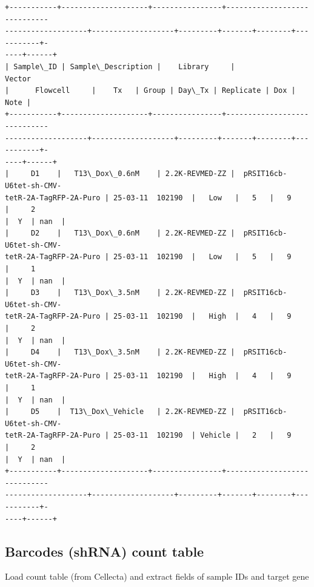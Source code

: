 \documentclass[11pt]{article}
\begin{document}
    \begin{Verbatim}[commandchars=\\\{\}]
+-----------+--------------------+----------------+-----------------------------
-------------------+-------------------+---------+-------+--------+-----------+-
----+------+
| Sample\_ID | Sample\_Description |    Library     |                     Vector
|      Flowcell     |    Tx   | Group | Day\_Tx | Replicate | Dox | Note |
+-----------+--------------------+----------------+-----------------------------
-------------------+-------------------+---------+-------+--------+-----------+-
----+------+
|     D1    |   T13\_Dox\_0.6nM    | 2.2K-REVMED-ZZ |  pRSIT16cb-U6tet-sh-CMV-
tetR-2A-TagRFP-2A-Puro | 25-03-11  102190  |   Low   |   5   |   9    |     2
|  Y  | nan  |
|     D2    |   T13\_Dox\_0.6nM    | 2.2K-REVMED-ZZ |  pRSIT16cb-U6tet-sh-CMV-
tetR-2A-TagRFP-2A-Puro | 25-03-11  102190  |   Low   |   5   |   9    |     1
|  Y  | nan  |
|     D3    |   T13\_Dox\_3.5nM    | 2.2K-REVMED-ZZ |  pRSIT16cb-U6tet-sh-CMV-
tetR-2A-TagRFP-2A-Puro | 25-03-11  102190  |   High  |   4   |   9    |     2
|  Y  | nan  |
|     D4    |   T13\_Dox\_3.5nM    | 2.2K-REVMED-ZZ |  pRSIT16cb-U6tet-sh-CMV-
tetR-2A-TagRFP-2A-Puro | 25-03-11  102190  |   High  |   4   |   9    |     1
|  Y  | nan  |
|     D5    |  T13\_Dox\_Vehicle   | 2.2K-REVMED-ZZ |  pRSIT16cb-U6tet-sh-CMV-
tetR-2A-TagRFP-2A-Puro | 25-03-11  102190  | Vehicle |   2   |   9    |     2
|  Y  | nan  |
+-----------+--------------------+----------------+-----------------------------
-------------------+-------------------+---------+-------+--------+-----------+-
----+------+
    \end{Verbatim}

    \subsection{Barcodes (shRNA) count
table}\label{barcodes-shrna-count-table}

Load count table (from Cellecta) and extract fields of sample IDs and
target gene
\end{document}

